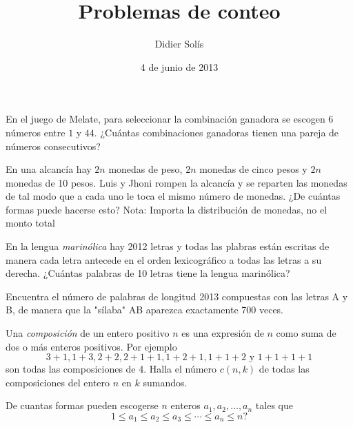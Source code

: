\documentclass[onecolumn,11pt,final]{ommdoc}
\title{Problemas de conteo}
\author{Didier Solís}
\date{4 de junio de 2013}
\begin{document}
\maketitle
\thispagestyle{empty}
\nonzeroparskip
\vspace{1cm}

\problema 	En el juego de Melate, para seleccionar la combinación ganadora se escogen 6 números entre $1$ y $44$. ¿Cuántas combinaciones ganadoras tienen una pareja de números consecutivos?

\problema En una alcancía hay $2n$ monedas de peso, $2n$ monedas de cinco pesos y $2n$ monedas de 10 pesos. Luis y Jhoni rompen la alcancía y se reparten las monedas de tal modo que a cada uno le toca el mismo número de monedas. ¿De cuántas formas puede hacerse esto?  {\small Nota: Importa la distribución de monedas, no el monto total}

\problema En la lengua \emph{marinólica} hay 2012 letras y todas las plabras están escritas
de manera cada letra antecede en el orden lexicográfico a todas las letras
a su derecha. ¿Cuántas palabras de 10 letras tiene la lengua marinólica?

\problema Encuentra el número de palabras de longitud 2013 compuestas con las
letras A y B, de manera que la "sílaba" AB aparezca exactamente 700 veces.

\problema Una \emph{composición} de un entero positivo $n$ es una expresión de $n$ como suma
de dos o más enteros positivos. Por ejemplo 
\[3 + 1, 1 + 3, 2 + 2, 2 + 1 + 1,
1+2+1, 1+1+2 \text{ y } 1+1+1+1\]
son todas las composiciones de 4. Halla el número $c(n,k)$ de todas las composiciones del entero $n$ en $k$ sumandos.

\problema De cuantas formas pueden escogerse $n$ enteros $a_1,a_2,\ldots,a_n$ tales que 
\[
1 \le a_1\le a_2 \le a_3 \le \cdots \le a_n \le n \text{?}
\]
\end{document}
